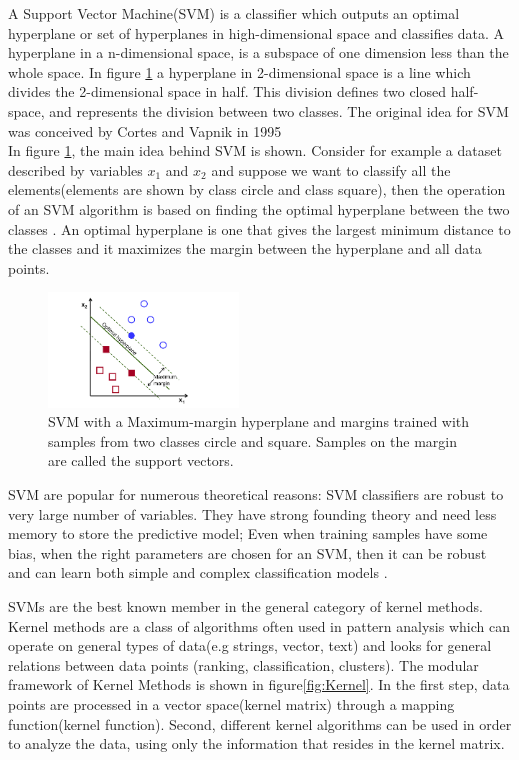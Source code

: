 A Support Vector Machine(SVM) is a classifier which outputs an optimal hyperplane or set of hyperplanes in high-dimensional space and classifies data. A hyperplane in a n-dimensional space, is a subspace of one dimension less than the whole space. In figure \ref{fig:SVM} a hyperplane in 2-dimensional space is a line which divides the 2-dimensional space in half. This division defines two closed half-space, and represents the division between two classes. The original idea for SVM was conceived by Cortes and Vapnik in 1995 \cite{cortes1995support} \\
In figure \ref{fig:SVM}, the main idea behind SVM is shown. Consider for example a dataset described by variables $x_1$ and $x_2$ and suppose we want to classify all the elements(elements are shown by class circle and class square), then the operation of an SVM algorithm is based on finding the optimal hyperplane between the two classes \cite{opencv_library}. An optimal hyperplane is one that gives the largest minimum distance to the classes and it maximizes the margin between the hyperplane and all data points. %

\begin{figure}[H]
    \includegraphics[width=0.45\textwidth]{./img/SVM.png}
    \caption{\footnotesize{SVM with a Maximum-margin hyperplane and margins trained with samples from two classes circle and square. Samples on the margin are called the support vectors.\cite{wiki:SVM}}}
    \label{fig:SVM}
\end{figure}


SVM are popular for numerous theoretical reasons: SVM classifiers are robust to very large number of variables. They have strong founding theory and need less memory to store the predictive model; Even when training samples have some bias, when the right parameters are chosen for an SVM, then it can be robust\cite{auria2008support} and can learn both simple and complex classification models \cite{cristianini2000}. 


SVMs are the best known member in the general category of kernel methods. Kernel methods are a class of algorithms often used in pattern analysis which can operate on general types of data(e.g strings, vector, text) and looks for general relations between data points (ranking, classification, clusters). The modular framework of Kernel Methods is shown in figure\ref{fig:Kernel}. In the first step, data points are processed in a vector space(kernel matrix) through a mapping function(kernel function). Second, different kernel algorithms can be used in order to analyze the data, using only the information that resides in the kernel matrix. \cite{shawe2004kernel}\\

